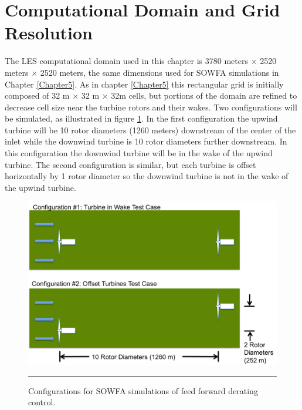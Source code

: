 
\section{Computational Domain and Grid Resolution} \label{section6-3}

The LES computational domain used in this chapter is 3780 meters $\times$ 2520 meters $\times$ 2520 meters, the same dimensions used for SOWFA simulations in Chapter \ref{Chapter5}. As in chapter \ref{Chapter5} this rectangular grid is initially composed of 32 m $\times$ 32 m $\times$ 32m cells, but portions of the domain are refined to decrease cell size near the turbine rotors and their wakes. Two configurations will be simulated, as illustrated in figure \ref{fig6-1}. In the first configuration the upwind turbine will be 10 rotor diameters (1260 meters) downstream of the center of the inlet while the downwind turbine is 10 rotor diameters further downstream. In this configuration the downwind turbine will be in the wake of the upwind turbine. The second configuration is similar, but each turbine is offset horizontally by 1 rotor diameter so the downwind turbine is not in the wake of the upwind turbine. 

\begin{figure}[htbp]
	\centering
		\includegraphics[width = \linewidth]{Figures/ch6Figures/fig6-1.png}
		\rule{35em}{0.5pt}
	\caption{Configurations for SOWFA simulations of feed forward derating control.}
	\label{fig6-1}
\end{figure}


